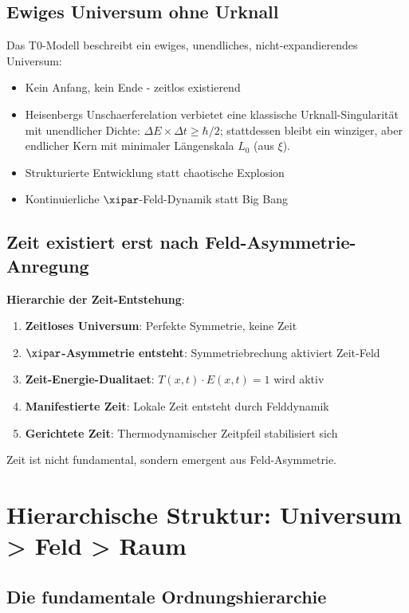 	\subsection{Ewiges Universum ohne Urknall}
	
	Das T0-Modell beschreibt ein ewiges, unendliches, nicht-expandierendes Universum:
	
	\begin{itemize}
		\item Kein Anfang, kein Ende - zeitlos existierend
		\item Heisenbergs Unschaerferelation verbietet eine klassische Urknall-Singularität mit unendlicher Dichte: $\Delta E \times \Delta t \geq \hbar/2$; stattdessen bleibt ein winziger, aber endlicher Kern mit minimaler Längenskala $L_0$ (aus $\xi$).
		\item Strukturierte Entwicklung statt chaotische Explosion
		\item Kontinuierliche $\xipar$-Feld-Dynamik statt Big Bang
	\end{itemize}
	
	\subsection{Zeit existiert erst nach Feld-Asymmetrie-Anregung}
	
	\textbf{Hierarchie der Zeit-Entstehung}:
	\begin{enumerate}
		\item \textbf{Zeitloses Universum}: Perfekte Symmetrie, keine Zeit
		\item \textbf{$\xipar$-Asymmetrie entsteht}: Symmetriebrechung aktiviert Zeit-Feld
		\item \textbf{Zeit-Energie-Dualitaet}: $T(x,t) \cdot E(x,t) = 1$ wird aktiv
		\item \textbf{Manifestierte Zeit}: Lokale Zeit entsteht durch Felddynamik
		\item \textbf{Gerichtete Zeit}: Thermodynamischer Zeitpfeil stabilisiert sich
	\end{enumerate}
	
	Zeit ist nicht fundamental, sondern emergent aus Feld-Asymmetrie.
	
	\section{Hierarchische Struktur: Universum > Feld > Raum}
	
	\subsection{Die fundamentale Ordnungshierarchie}
	
